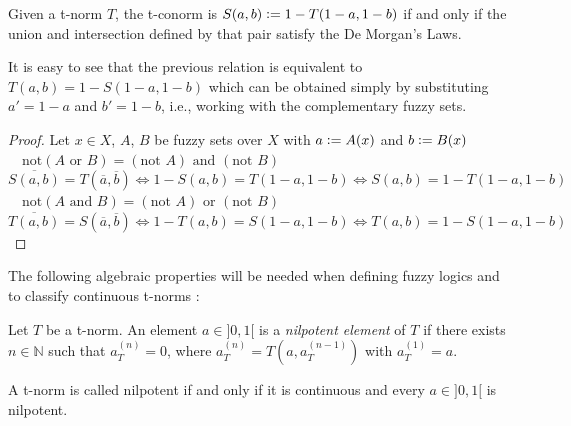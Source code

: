 \begin{proposition}\label{prop:rel_tnorm_tconorm}
  Given a t-norm $T$, the t-conorm is $S(a,b)\mathrel{\mathop:}= 1 - T(1-a, 1-b)$ if and only if the union and intersection defined by that pair satisfy the De Morgan's Laws.
\end{proposition}
\begin{remark}
  It is easy to see that the previous relation is equivalent to $T(a,b) = 1-S(1-a, 1-b)$ which can be obtained simply by substituting $a'=1-a$ and $b'=1-b$, i.e., working with the complementary fuzzy sets.
\end{remark}

\begin{proof}
  Let $x\in X$, $A$, $B$ be fuzzy sets over $X$ with $a \mathrel{\mathop:}= A(x)$ and $b \mathrel{\mathop:}= B(x)$\\

  $\quad \boxed{\text{not}(A \text{ or } B) = (\text{not } A) \text{ and } (\text{not } B)}$\\
  [0.5em]
  $\overline{ S(a,b)} = T(\overline{ a}, \overline{ b}) \iff 1 - S(a,b) = T(1-a, 1-b) \iff S(a,b) = 1 - T(1-a, 1-b)$\\

  $\quad \boxed{\text{not}(A \text{ and } B) = (\text{not } A) \text{ or } (\text{not } B)}$\\
  [0.5em]
  $\overline{ T(a,b)} = S(\overline{ a}, \overline{ b}) \iff 1 - T(a,b) = S(1-a, 1-b) \iff T(a,b) = 1 - S(1-a, 1-b)$

\end{proof}






The following algebraic properties will be needed when defining fuzzy logics and to classify continuous t-norms \cite[Def.~2.1 \& 2.13]{Klement2000}:

\begin{definition}
Let $T$ be a t-norm. An element $a \in ]0,1[$ is a \emph{nilpotent element} of $T$ if there exists $n \in \mathbb{N}$ such that $a_T^{(n)} = 0$, where $a_T^{(n)} = T(a, a_T^{(n-1)})$ with $a_T^{(1)}=a$.

A t-norm is called nilpotent if and only if it is continuous and every $a\in ]0,1[$ is nilpotent.
\end{definition}

